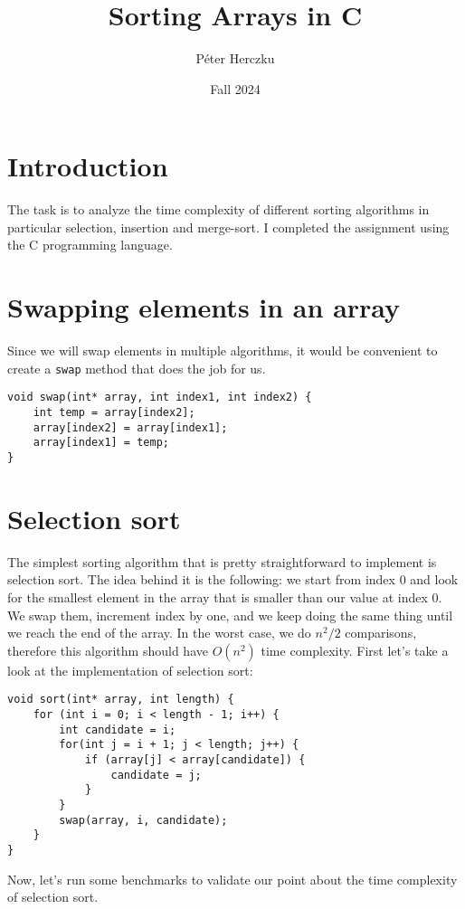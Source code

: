 \documentclass[a4paper,11pt]{article}
\begin{document}
    \title{
        \textbf{Sorting Arrays in C}
    }
    \author{Péter Herczku}
    \date{Fall 2024}

    \maketitle

    \section*{Introduction}

    The task is to analyze the time complexity of different sorting algorithms in particular selection, insertion and merge-sort.
    I completed the assignment using the C programming language.

    \section*{Swapping elements in an array}

    Since we will swap elements in multiple algorithms, it would be convenient to create a {\tt swap} method that does the job for us.

    \begin{verbatim}
void swap(int* array, int index1, int index2) {
    int temp = array[index2];
    array[index2] = array[index1];
    array[index1] = temp;
}
    \end{verbatim}

    \section*{Selection sort}

    The simplest sorting algorithm that is pretty straightforward to implement is selection sort.
    The idea behind it is the following: we start from index 0 and look for the smallest element in the array that is smaller than our value at index 0.
    We swap them, increment index by one, and we keep doing the same thing until we reach the end of the array.
    In the worst case, we do $n^2/2$ comparisons, therefore this algorithm should have $O(n^2)$ time complexity.
    First let's take a look at the implementation of selection sort:

    \begin{verbatim}
void sort(int* array, int length) {
    for (int i = 0; i < length - 1; i++) {
        int candidate = i;
        for(int j = i + 1; j < length; j++) {
            if (array[j] < array[candidate]) {
                candidate = j;
            }
        }
        swap(array, i, candidate);
    }
}
    \end{verbatim}
    Now, let's run some benchmarks to validate our point about the time complexity of selection sort.
\end{document}
